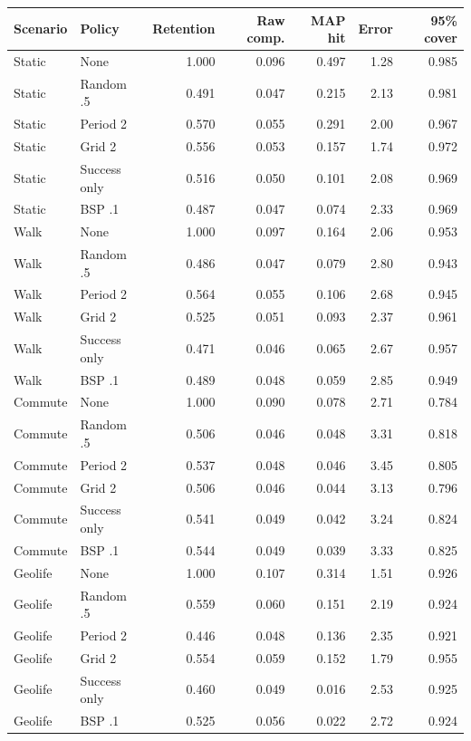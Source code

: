 \begin{tabular}{llrrrrr}
\toprule
Scenario & Policy & Retention & Raw comp. & MAP hit & Error & 95\% cover \\
\midrule
Static & None & 1.000 & 0.096 & 0.497 & 1.28 & 0.985 \\
Static & Random .5 & 0.491 & 0.047 & 0.215 & 2.13 & 0.981 \\
Static & Period 2 & 0.570 & 0.055 & 0.291 & 2.00 & 0.967 \\
Static & Grid 2 & 0.556 & 0.053 & 0.157 & 1.74 & 0.972 \\
Static & Success only & 0.516 & 0.050 & 0.101 & 2.08 & 0.969 \\
Static & BSP .1 & 0.487 & 0.047 & 0.074 & 2.33 & 0.969 \\
\addlinespace
Walk & None & 1.000 & 0.097 & 0.164 & 2.06 & 0.953 \\
Walk & Random .5 & 0.486 & 0.047 & 0.079 & 2.80 & 0.943 \\
Walk & Period 2 & 0.564 & 0.055 & 0.106 & 2.68 & 0.945 \\
Walk & Grid 2 & 0.525 & 0.051 & 0.093 & 2.37 & 0.961 \\
Walk & Success only & 0.471 & 0.046 & 0.065 & 2.67 & 0.957 \\
Walk & BSP .1 & 0.489 & 0.048 & 0.059 & 2.85 & 0.949 \\
\addlinespace
Commute & None & 1.000 & 0.090 & 0.078 & 2.71 & 0.784 \\
Commute & Random .5 & 0.506 & 0.046 & 0.048 & 3.31 & 0.818 \\
Commute & Period 2 & 0.537 & 0.048 & 0.046 & 3.45 & 0.805 \\
Commute & Grid 2 & 0.506 & 0.046 & 0.044 & 3.13 & 0.796 \\
Commute & Success only & 0.541 & 0.049 & 0.042 & 3.24 & 0.824 \\
Commute & BSP .1 & 0.544 & 0.049 & 0.039 & 3.33 & 0.825 \\
\addlinespace
Geolife & None & 1.000 & 0.107 & 0.314 & 1.51 & 0.926 \\
Geolife & Random .5 & 0.559 & 0.060 & 0.151 & 2.19 & 0.924 \\
Geolife & Period 2 & 0.446 & 0.048 & 0.136 & 2.35 & 0.921 \\
Geolife & Grid 2 & 0.554 & 0.059 & 0.152 & 1.79 & 0.955 \\
Geolife & Success only & 0.460 & 0.049 & 0.016 & 2.53 & 0.925 \\
Geolife & BSP .1 & 0.525 & 0.056 & 0.022 & 2.72 & 0.924 \\
\bottomrule
\end{tabular}
